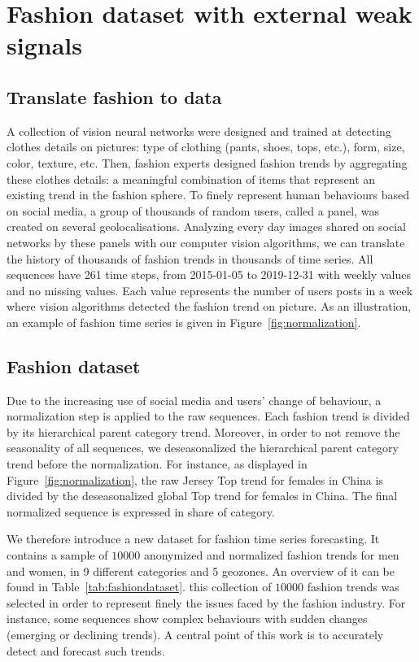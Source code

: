 \documentclass[lettersize,journal]{IEEEtran}
\newcommand{\numberts}{10000}
\begin{document}
\section{Fashion dataset with external weak signals}
\label{sec:dataset}

\subsection{Translate fashion to data}
\label{sec:dataset:a}
A collection of vision neural networks were designed and trained  at detecting clothes details on pictures: type of clothing (pants, shoes, tops, etc.), form, size, color, texture, etc. Then, fashion experts designed fashion trends by aggregating these clothes details: a meaningful combination of items that represent an existing trend in the fashion sphere. To finely represent human behaviours based on social media, a group of thousands of random users, called a panel, was created on several geolocalisations. Analyzing every day images shared on social networks by these panels with our computer vision algorithms, we can translate the history of thousands of fashion trends in thousands of time series.  All sequences have 261 time steps, from 2015-01-05 to 2019-12-31 with weekly values and no missing values. Each value represents the number of users posts in a week where vision algorithms detected the fashion trend on picture.  As an illustration, an example of fashion time series is given in Figure~\ref{fig:normalization}.

\subsection{Fashion dataset}
\label{sec:dataset:b}

Due to the increasing use of social media and users' change of behaviour, a normalization step is applied to the raw sequences. Each fashion trend is divided by its hierarchical parent category trend. Moreover, in order to not remove the seasonality of all sequences, we deseasonalized the hierarchical parent category trend before the normalization. For instance, as displayed in Figure~\ref{fig:normalization}, the raw Jersey Top trend for females in China is divided by the deseasonalized global Top trend for females in China. The final normalized sequence is expressed in share of category.

We therefore introduce a new dataset for fashion time series forecasting.  It contains a sample of $\numberts$ anonymized and  normalized fashion trends for men and women, in 9 different categories and 5 geozones. An overview of it can be found in Table~\ref{tab:fashiondataset}. this collection of $\numberts$ fashion trends was selected in order to represent finely the issues faced by the fashion industry. For instance, some sequences show complex behaviours with sudden changes (emerging or declining trends). A central point of this work is to accurately detect and forecast such trends.
\end{document}
